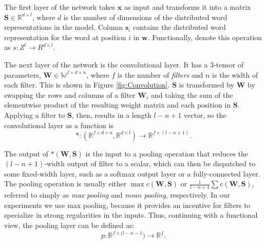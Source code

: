 The first layer of the network takes $\mathbf{x}$ as input and transforms it into a matrix $\mathbf{S} \in \mathbb{R}^{d \times l}$, where $d$ is the number of dimensions of the distributed word representations in the model.  Column $\mathbf{s}_i$ contains the distributed word representation for the word at position $i$ in $\mathbf{w}$.  Functionally, denote this operation as $s \colon Z^{l} \to R^{d \times l}$.

The next layer of the network is the convolutional layer.  It has a 3-tensor of parameters, $\mathbf{W} \in \mathbb{W}^{f \times d \times n}$, where $f$ is the number of \textit{filters} and $n$ is the width of each filter.  This is shown in Figure \ref{fig:Convolution}.  $\mathbf{S}$ is transformed by $\mathbf{W}$ by swapping the rows and columns of a filter $\mathbf{W}_i$ and taking the sum of the elementwise product of the resulting weight matrix and each position in $\mathbf{S}$.  Applying a filter to $\mathbf{S}$, then, results in a length $l - n + 1$ vector, so the convolutional layer as a function is
\begin{equation*}
\ast \colon (\mathbb{R}^{f \times d \times n}, \mathbb{R}^{d \times l}) \to \mathbb{R}^{f \times (l - n + 1)}.
\end{equation*}

The output of $\ast(\mathbf{W}, \mathbf{S})$ is the input to a pooling operation that reduces the $(l - n + 1)$-width output of filter to a scalar, which can then be dispatched to some fixed-width layer, such as a softmax output layer or a fully-connected layer.  The pooling operation is usually either $\max c(\mathbf{W}, \mathbf{S})$ or $\frac{1}{l - n + 1} \sum c(\mathbf{W}, \mathbf{S})$, referred to simply as \textit{max pooling} and \textit{mean pooling}, respectively.  In our experiments we use max pooling, because it provides an incentive for filters to specialize in strong regularities in the inputs.  Thus, continuing with a functional view, the pooling layer can be defined as:
\begin{equation*}
p \colon \mathbb{R}^{f \times (l - n - 1}) \to \mathbb{R}^f.
\end{equation*}
\fi



